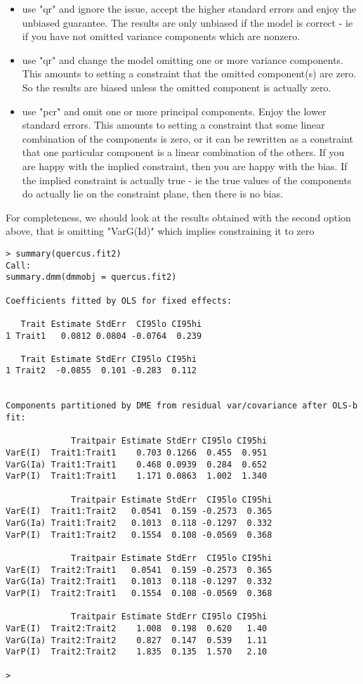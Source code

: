 \documentclass[titlepage]{article}  %
\begin{document}
\begin{itemize}
\item use "qr" and ignore the issue, accept the higher standard errors and enjoy the unbiased guarantee. The results are only unbiased if the model is correct - ie if you have not omitted variance components which are nonzero.
\item use "qr" and change the model omitting one or more variance components. This amounts to setting a constraint that the omitted component(s) are zero. So the results are biased unless the omitted component is actually zero.
\item use "pcr" and omit one or more principal components. Enjoy the lower standard errors. This amounts to setting a constraint that some linear combination of the components is zero, or it can be rewritten as a constraint that one particular component is a linear combination of the others. If you are happy with the implied constraint, then you are happy with the bias. If the implied constraint is actually true - ie the true values of the components do actually lie on the constraint plane, then there is no bias. 
\end{itemize}

For completeness, we should look at the results obtained with the second option above, that is omitting "VarG(Id)" which implies constraining it to zero

\begin{verbatim}
> summary(quercus.fit2)
Call:
summary.dmm(dmmobj = quercus.fit2)

Coefficients fitted by OLS for fixed effects:

   Trait Estimate StdErr  CI95lo CI95hi
1 Trait1   0.0812 0.0804 -0.0764  0.239

   Trait Estimate StdErr CI95lo CI95hi
1 Trait2  -0.0855  0.101 -0.283  0.112


Components partitioned by DME from residual var/covariance after OLS-b fit:

             Traitpair Estimate StdErr CI95lo CI95hi
VarE(I)  Trait1:Trait1    0.703 0.1266  0.455  0.951
VarG(Ia) Trait1:Trait1    0.468 0.0939  0.284  0.652
VarP(I)  Trait1:Trait1    1.171 0.0863  1.002  1.340

             Traitpair Estimate StdErr  CI95lo CI95hi
VarE(I)  Trait1:Trait2   0.0541  0.159 -0.2573  0.365
VarG(Ia) Trait1:Trait2   0.1013  0.118 -0.1297  0.332
VarP(I)  Trait1:Trait2   0.1554  0.108 -0.0569  0.368

             Traitpair Estimate StdErr  CI95lo CI95hi
VarE(I)  Trait2:Trait1   0.0541  0.159 -0.2573  0.365
VarG(Ia) Trait2:Trait1   0.1013  0.118 -0.1297  0.332
VarP(I)  Trait2:Trait1   0.1554  0.108 -0.0569  0.368

             Traitpair Estimate StdErr CI95lo CI95hi
VarE(I)  Trait2:Trait2    1.008  0.198  0.620   1.40
VarG(Ia) Trait2:Trait2    0.827  0.147  0.539   1.11
VarP(I)  Trait2:Trait2    1.835  0.135  1.570   2.10

> 
\end{verbatim}
\end{document}
